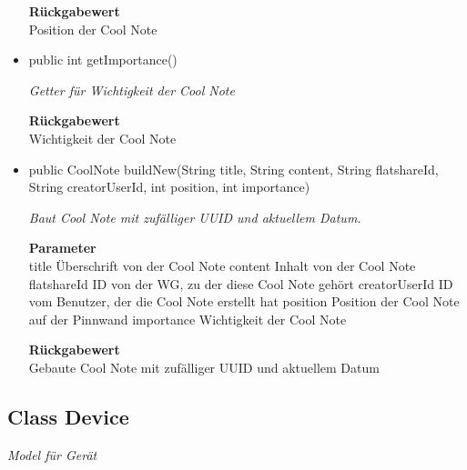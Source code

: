 \documentclass[a4paper]{scrreprt}
\begin{document}
\begin{itemize}
    	\textbf{Rückgabewert} \\
    	Position der Cool Note        \item{public int getImportance()}
    	
    	\textit{Getter für Wichtigkeit der Cool Note}
    	
    	
    	
    	\textbf{Rückgabewert} \\
    	Wichtigkeit der Cool Note        \item{public CoolNote buildNew(String title, String content, String flatshareId, String creatorUserId, int position, int importance)}
    	
    	\textit{Baut Cool Note mit zufälliger UUID und aktuellem Datum.}
    	
    	\textbf{Parameter} \\
    	title Überschrift von der Cool Note
    	content Inhalt von der Cool Note
    	flatshareId ID von der WG, zu der diese Cool Note gehört
    	creatorUserId ID vom Benutzer, der die Cool Note erstellt hat
    	position Position der Cool Note auf der Pinnwand
    	importance Wichtigkeit der Cool Note
    	
    	\textbf{Rückgabewert} \\
    	Gebaute Cool Note mit zufälliger UUID und aktuellem Datum
    \end{itemize}
    \subsection{Class Device}
    \textit{Model für Gerät}
\end{document}
